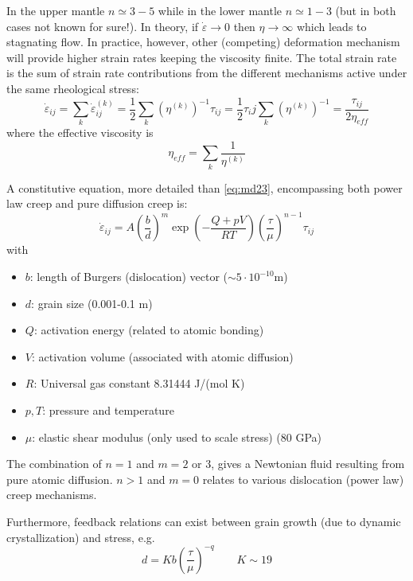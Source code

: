In the upper mantle $n \simeq 3 - 5$ while in the lower mantle $n \simeq 1 - 3$ 
(but in both cases not known for sure!). 
In theory, if $\dot\varepsilon \rightarrow 0$ then $\eta \rightarrow\infty$ 
which leads to stagnating flow. In
practice, however, other (competing) deformation mechanism will provide higher strain
rates keeping the viscosity finite. The total strain rate is the sum of strain rate
contributions from the different mechanisms active under the same rheological stress:
\[
\dot\varepsilon_{ij} 
= \sum_k \dot\varepsilon_{ij}^{(k)} 
= \frac12 \sum_k (\eta^{(k)})^{-1} \tau_{ij}
= \frac12 \tau_ij \sum_k (\eta^{(k)})^{-1}
= \frac{\tau_{ij}}{2 \eta_{eff}} 
\]
where the effective viscosity is
\begin{equation}
\eta_{eff} = \sum_k \frac{1}{\eta^{(k)}}
\label{eq:md29}
\end{equation}

A constitutive equation, more detailed than \eqref{eq:md23}, encompassing both power law creep and
pure diffusion creep is:
\begin{equation}
\dot\varepsilon_{ij} = A \left( \frac{b}{d}\right)^m 
\exp \left( - \frac{Q + pV}{RT} \right) 
\left( \frac{\tau}{\mu}  \right)^{n-1}  \tau_{ij}
\label{eq:md30}
\end{equation}
with
\begin{itemize}
\item $b$: length of Burgers (dislocation) vector ($\sim 5 \cdot 10^{-10}\si{\meter}$)
\item $d$: grain size (0.001-0.1 m)
\item $Q$: activation energy (related to atomic bonding)
\item $V$: activation volume (associated with atomic diffusion)
\item $R$: Universal gas constant 8.31444 J/(mol K)
\item $p,T$: pressure and temperature
\item $\mu$: elastic shear modulus (only used to scale stress) (80 GPa)
\end{itemize}

The combination of $n=1$ and $m=2$ or 3, gives a Newtonian fluid resulting from pure
atomic diffusion. $n>1$ and $m=0$ relates to various dislocation (power law) creep
mechanisms.

Furthermore, feedback relations can exist between grain growth (due to dynamic
crystallization) and stress, e.g.
\begin{equation}
d = K b \left( \frac{\tau}{\mu} \right)^{-q} \qquad K\sim 19
\end{equation}

